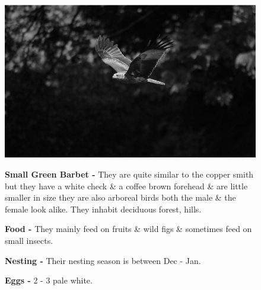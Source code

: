 \begin{figure}[H]
\begin{center}
\includegraphics{figure/Land_birds/01_pariah_kite/pariah-kite.eps}
\end{center}
\medskip
\noindent
{\bf Small Green Barbet -} They are quite similar to the copper smith but they have a white check \& a coffee brown forehead \& are little smaller in size they are also arboreal birds both the male \& the female look alike. They inhabit deciduous forest, hills.

\medskip
{\bf Food -} They mainly feed on fruits \& wild figs \& sometimes feed on small insects.

{\bf Nesting -} Their nesting season is between Dec - Jan.

{\bf Eggs -} 2 - 3 pale white.
\end{figure}

\vfill\eject

~\phantom{a}
\vfill

